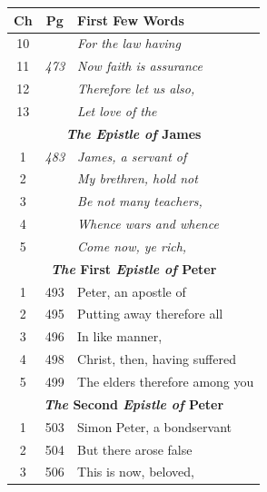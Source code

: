 \documentclass{article}
\newlength{\minipageheight}
\newlength{\minipagewidth}
\begin{document}
%
%
\begin{minipage}[r][\minipageheight][t]{\minipagewidth}%
    \begin{longtable}{ccl}
        \textbf{Ch} & \textbf{Pg}    & \textbf{First Few Words}                    \\%
        \hline%
        \endfirsthead%
        10          &                & \textit{For the law having}                 \\
        11          & \textit{473}   & \textit{Now faith is assurance}             \\
        12          &                & \textit{Therefore let us also,}             \\
        13          &                & \textit{Let love of the}                    \\

        \multicolumn{3}{c}{\textbf{\textit{The Epistle of} James}}                 \\
        \hline
        1           & \textit{483}   & \textit{James, a servant of}                \\
        2           &                & \textit{My brethren, hold not}              \\
        3           &                & \textit{Be not many teachers,}              \\
        4           &                & \textit{Whence wars and whence}             \\
        5           &                & \textit{Come now, ye rich,}                 \\
        \multicolumn{3}{c}{\textbf{\textit{The} First \textit{Epistle of} Peter}}  \\
        \hline
        1           & 493            & Peter, an apostle of                        \\
        2           & 495            & Putting away therefore all                  \\
        3           & 496            & In like manner,                             \\%
        4           & 498            & Christ, then, having suffered               \\
        5           & 499            & The elders therefore among you              \\
        \multicolumn{3}{c}{\textbf{\textit{The} Second \textit{Epistle of} Peter}} \\
        \hline
        1           & 503            & Simon Peter, a bondservant                  \\
        2           & 504            & But there arose false                       \\
        3           & 506            & This is now, beloved,                       \\


\end{longtable}
\end{minipage}
\end{document}
